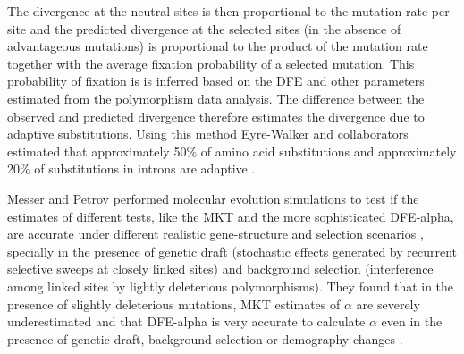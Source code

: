 The divergence at the neutral sites is then proportional to the mutation rate per site and the predicted divergence at the selected sites (in the absence of advantageous mutations) is proportional to the product of the mutation rate together with the average fixation probability of a selected mutation.
This probability of fixation is is inferred based on the DFE and other parameters estimated from the polymorphism data analysis\citep{Eyre-Walker2009}.
The difference between the observed and predicted divergence therefore estimates the divergence due to adaptive substitutions.
%
Using this method Eyre-Walker and collaborators estimated that approximately 50\% of amino acid substitutions and approximately 20\% of substitutions in introns are adaptive \citep{Eyre-Walker2009}.

Messer and Petrov performed molecular evolution simulations to test if the estimates of different tests, like the MKT and the more sophisticated DFE-alpha, are accurate under different realistic gene-structure and selection scenarios \citep{Messer2013}, specially in the presence of genetic draft (stochastic effects generated by recurrent selective sweeps at closely linked sites)
and background selection (interference among linked sites by lightly deleterious polymorphisms).
%
They found that in the presence of slightly deleterious mutations, MKT estimates of $\alpha$ are severely underestimated and that DFE-alpha is very accurate to calculate $\alpha$ even in the presence of genetic draft, background selection or demography changes \citep{Messer2013}.
%
%
%
%
%


